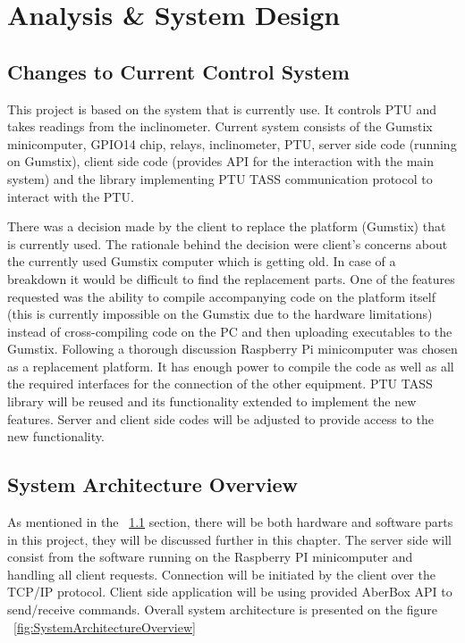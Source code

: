 \chapter{Analysis \& System Design}

\section{Changes to Current Control System}
\label{sec:Control_System}
This project is based on the system that is currently use. It controls PTU and takes readings from the inclinometer. Current system consists of the Gumstix minicomputer, GPIO14 chip, relays, inclinometer, PTU, server side code (running on Gumstix), client side code (provides API for the interaction with the main system) and the library implementing PTU TASS communication protocol to interact with the PTU.

There was a decision made by the client to replace the platform (Gumstix) that is currently used. The rationale behind the decision were client's concerns about the currently used Gumstix computer which is getting old. In case of a breakdown it would be difficult to find the replacement parts. One of the features requested was the ability to compile accompanying code on the platform itself (this is currently impossible on the Gumstix due to the hardware limitations) instead of cross-compiling code on the PC and then uploading executables to the Gumstix. Following a thorough discussion Raspberry Pi minicomputer was chosen as a replacement platform. It has enough power to compile the code as well as all the required interfaces for the connection of the other equipment. PTU TASS library will be reused and its functionality extended to implement the new features. Server and client side codes will be adjusted to provide access to the new functionality.

\section{System Architecture Overview}
As mentioned in the ~\ref{sec:Control_System} section, there will be both hardware and software parts in this project, they will be discussed further in this chapter. The server side will consist from the software running on the Raspberry PI minicomputer and handling all client requests. Connection will be initiated by the client over the TCP/IP protocol. Client side application will be using provided AberBox API to send/receive commands. Overall system architecture is presented on the figure ~\ref{fig:SystemArchitectureOverview}

